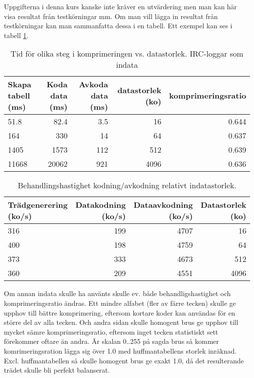 \documentclass[a4paper, 11pt]{article}
\begin{document}
Uppgifterna i denna kurs kanske inte kräver en utvärdering men man kan
här visa resultat från testkörningar mm. Om man vill lägga in resultat
från testkörningar kan man sammanfatta dessa i en tabell. Ett exempel
kan ses i tabell \ref{tab:results}. 


\begin{table}
\centering
\begin{tabular}{|l|r|r|r|r|}  
\hline
Skapa tabell (ms) & Koda data (ms) & Avkoda data (ms) & datastorlek (ko) & komprimeringsratio\\
\hline
51.8 & 82.4 & 3.5 & 16 & 0.644\\
\hline
164 & 330 & 14 & 64 & 0.637\\
\hline
1405 & 1573 & 112 & 512 & 0.639\\
\hline
11668 & 20062 & 921 & 4096 & 0.636\\
\hline
\end{tabular}
\caption{Tid för olika steg i komprimeringen vs. datastorlek. IRC-loggar som indata}
\label{tab:results}
\end{table}

\begin{table}
\centering
\begin{tabular}{|l|r|r|r|}  
\hline
Trädgenerering (ko/s) & Datakodning (ko/s) & Dataavkodning (ko/s) & Datastorlek (ko)\\
\hline
316 & 199 & 4707 & 16\\
\hline
400 & 198 & 4759 & 64\\
\hline
373 & 333 & 4673 & 512\\
\hline
360 & 209 & 4551 & 4096\\
\hline
\end{tabular}
\caption{Behandlingshastighet kodning/avkodning relativt indatastorlek.}
\label{tab:results2}
\end{table}


Om annan indata skulle ha använts skulle ev. både behandligshastighet och komprimeringsratio ändras. Ett mindre alfabet (fler av färre tecken) skulle ge upphov till bättre komprimering, eftersom kortare koder kan användas för en större del av alla tecken. Och andra sidan skulle homogent brus ge upphov till mycket sämre komprimeringsratio, eftersom inget tecken statistiskt sett förekommer oftare än andra. Är skalan 0..255 på sagda brus så kommer komrimeringsration lägga sig över 1.0 med huffmantabellens storlek inräknad. Excl. huffmantabellen så skulle homogent brus ge exakt 1.0, då det resulterande trädet skulle bli perfekt balanserat.
\end{document}
